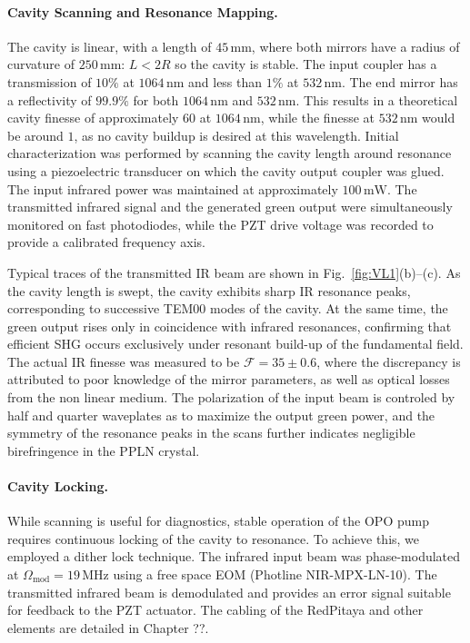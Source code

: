 \paragraph{Cavity Scanning and Resonance Mapping.}
The cavity is linear, with a length of $45 \, \text{mm}$, where both mirrors have a radius of curvature of $250 \, \text{mm}$: $L<2R$ so the cavity is stable. The input coupler has a transmission of $10 \%$ at $1064 \, \text{nm}$ and less than $1 \%$ at $532 \, \text{nm}$. The end mirror has a reflectivity of $99.9 \%$ for both $1064 \, \text{nm}$ and $532 \, \text{nm}$. This results in a theoretical cavity finesse of approximately $60$ at $1064 \, \text{nm}$, while the finesse at $532 \, \text{nm}$ would be around $1$, as no cavity buildup is desired at this wavelength.
Initial characterization was performed by scanning the cavity length around resonance using a piezoelectric transducer on which the cavity output coupler was glued. The input infrared power was maintained at approximately $100\,\mathrm{mW}$. The transmitted infrared signal and the generated green output were simultaneously monitored on fast photodiodes, while the PZT drive voltage was recorded to provide a calibrated frequency axis. 

Typical traces of the transmitted IR beam are shown in Fig.~\ref{fig:VL1}(b)–(c). As the cavity length is swept, the cavity exhibits sharp IR resonance peaks, corresponding to successive TEM00 modes of the cavity. At the same time, the green output rises only in coincidence with infrared resonances, confirming that efficient SHG occurs exclusively under resonant build-up of the fundamental field. The actual IR finesse was measured to be $\mathcal{F} = 35 \pm 0.6$, where the discrepancy is attributed to poor knowledge of the mirror parameters, as well as optical losses from the non linear medium. The polarization of the input beam is controled by half and quarter waveplates as to maximize the output green power, and the symmetry of the resonance peaks in the scans further indicates negligible birefringence in the PPLN crystal.


\paragraph{Cavity Locking.}
While scanning is useful for diagnostics, stable operation of the OPO pump requires continuous locking of the cavity to resonance. To achieve this, we employed a dither lock technique. The infrared input beam was phase-modulated at $\Omega_\mathrm{mod} = 19\,\mathrm{MHz}$ using a free space EOM (Photline NIR-MPX-LN-10). The transmitted infrared beam is demodulated and provides an error signal suitable for feedback to the PZT actuator. The cabling of the RedPitaya and other elements are detailed in Chapter ??.


